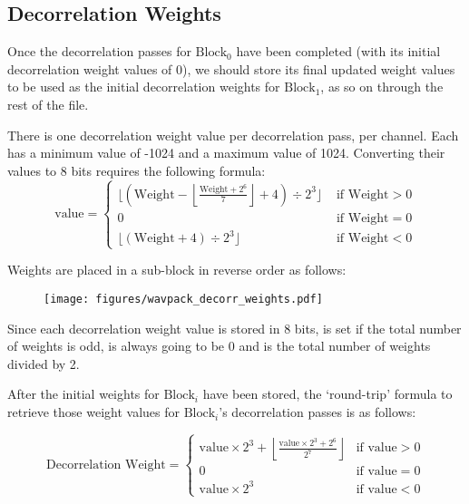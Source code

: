 
\clearpage

\subsection{Decorrelation Weights}

Once the decorrelation passes for $\text{Block}_0$ have been completed
(with its initial decorrelation weight values of 0),
we should store its final updated weight values to be used as the initial
decorrelation weights for $\text{Block}_1$, as so on through
the rest of the file.

There is one decorrelation weight value per decorrelation pass, per channel.
Each has a minimum value of -1024 and a maximum value of 1024.
Converting their values to 8 bits requires the following formula:
\begin{equation*}
\text{value} = \begin{cases}
\lfloor(\text{Weight} - \left\lfloor\frac{\text{Weight} + 2 ^ 6}{7}\right\rfloor + 4) \div 2 ^ 3\rfloor & \text{ if Weight} > 0 \\
0 & \text{ if Weight} = 0 \\
\lfloor(\text{Weight} + 4) \div 2 ^ 3\rfloor & \text{ if Weight} < 0
\end{cases}
\end{equation*}
\par
\noindent
Weights are placed in a sub-block in reverse order as follows:

\begin{figure}[h]
\texttt{[image: figures/wavpack\_decorr\_weights.pdf]}
\end{figure}

Since each decorrelation weight value is stored in 8 bits,
 is set if the total number of weights is odd,
 is always going to be 0
and  is the total number of weights divided by 2.

After the initial weights for $\text{Block}_i$ have been stored,
the `round-trip' formula to retrieve those weight values
for $\text{Block}_i$'s decorrelation passes is as follows:

\begin{equation*}
\text{Decorrelation Weight} =
\begin{cases}
\text{value} \times 2 ^ 3 + \left\lfloor\frac{\text{value} \times 2 ^ 3 + 2 ^ 6}{2 ^ 7}\right\rfloor & \text{if value} > 0 \\
0 & \text{if value} = 0 \\
\text{value} \times 2 ^ 3 & \text{if value} < 0
\end{cases}
\end{equation*}

